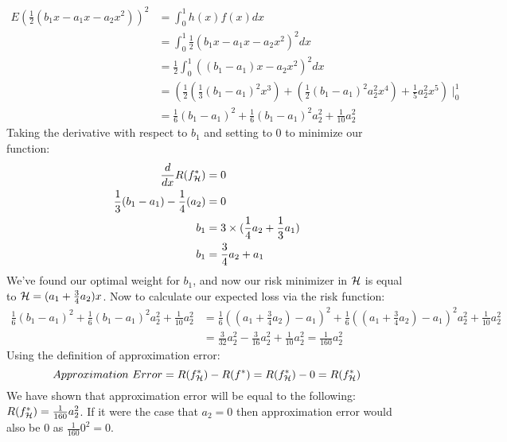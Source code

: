\documentclass{article}
\begin{document}
\begin{enumerate}
    \begin{equation}
        \begin{split}
            E(\frac{1}{2}(b_1x - a_1x - a_2x^2))^2 &= \int_0^1 h(x)f(x)dx \\
            &= \int_0^1 \frac{1}{2}(b_1x - a_1x - a_2x^2)^2dx \\
            &= \frac{1}{2} \int_0^1 ((b_1 - a_1)x - a_2x^2)^2dx \\
            &=( \frac{1}{2}(\frac{1}{3}(b_1-a_1)^2x^3) + (\frac{1}{2}(b_1-a_1)^2a_2^2x^4)+\frac{1}{5}a_2^2x^5)\mid_0^1 \\ 
            &= \frac{1}{6}(b_1-a_1)^2 + \frac{1}{6}(b_1-a_1)^2a_2^2 +
            \frac{1}{10}a_2^2
        \end{split}
    \end{equation}
    Taking the derivative with respect to $b_1$ and setting to 0 to minimize our function:
\begin{equation}
    \begin{split}
        \frac{d}{dx}R(f_{\mathcal{H}}^*) &= 0 \\ \frac{1}{3}(b_1-a_1)-\frac{1}{4}(a_2) &= 0 \\
        b_1 &= 3 \times (\frac{1}{4}a_2 + \frac{1}{3}a_1) \\
        b_1 &= \frac{3}{4}a_2 + a_1
    \end{split}
\end{equation}
We've found our optimal weight for $b_1$, and now our risk minimizer in ${\mathcal{H}}$ is equal to ${\mathcal{H}} = (a_1 + \frac{3}{4}a_2)x$. Now to calculate our expected loss via the risk function:
\begin{equation}
    \begin{split}
        \frac{1}{6}(b_1-a_1)^2 + \frac{1}{6}(b_1-a_1)^2a_2^2 +
            \frac{1}{10}a_2^2 &= \frac{1}{6}((a_1 + \frac{3}{4}a_2)-a_1)^2 + \frac{1}{6}((a_1 + \frac{3}{4}a_2)-a_1)^2a_2^2 +
            \frac{1}{10}a_2^2 \\ 
            &= \frac{3}{32}a_2^2 - \frac{3}{16}a_2^2 + \frac{1}{10}a_2^2 = \frac{1}{160}a_2^2
    \end{split}
\end{equation}
Using the definition of approximation error:
$$Approximation \ Error = R(f^*_{\mathcal{H}}) - R(f^*) = R(f^*_{\mathcal{H}}) - 0 = R(f^*_{\mathcal{H}})$$
We have shown that approximation error will be equal to the following: $R(f^*_{\mathcal{H}}) = \frac{1}{160}a_2^2$. If it were the case that $a_2=0$ then approximation error would also be $0$ as $\frac{1}{160}0^2 = 0$.

\setcounter{saveenum}{\value{enumi}}
\end{enumerate}
\end{document}
